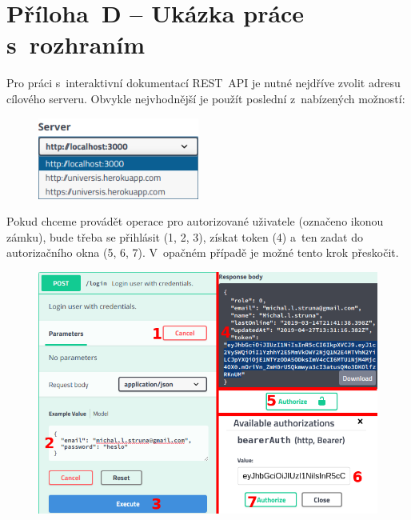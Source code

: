 \documentclass[a4paper,12pt]{article}
\begin{document}
\section*{Příloha~D -- Ukázka práce s~rozhraním}

Pro práci s~interaktivní dokumentací REST~API je nutné nejdříve zvolit adresu cílového serveru. Obvykle nejvhodnější je použít poslední z~nabízených možností:

\vspace{-0.3cm}
\begin{figure}[H]
\begin{center}
\includegraphics[width=150pt]{Images/ApiServer.png}
\end{center}
\end{figure}

\vspace{-0.5cm}
Pokud chceme provádět operace pro autorizované uživatele (označeno ikonou zámku), bude třeba se přihlásit (1, 2, 3), získat token (4) a~ten zadat do autorizačního okna (5, 6, 7). V~opačném případě je možné tento krok přeskočit.

\begin{figure}[H]
\begin{center}
\includegraphics[width=440pt]{Images/ApiLogin.png}
\end{center}
\end{figure}
\end{document}
